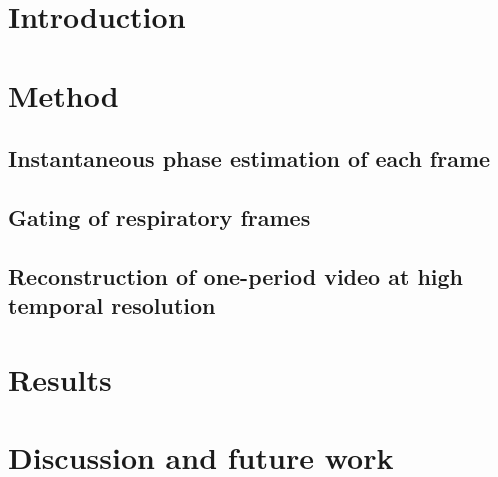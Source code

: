 \documentclass[runningheads,a4paper]{llncs}
\begin{document}
\vspace{-0.5cm}
\section{Introduction}
\label{sec:intro}
%

%
\vspace{-0.5cm}
\section{Method}
\label{sec:method}
%

%
\vspace{-0.5cm}
\subsection{Instantaneous phase estimation of each frame}
\label{sec:method:phase_estimation}
%

%
\vspace{-0.5cm}
\subsection{Gating of respiratory frames}
\label{sec:method:gating}
%

%
\vspace{-0.5cm}
\subsection{Reconstruction of one-period video at high temporal resolution}
\label{sec:method:gating}
%

\vspace{-0.5cm}
\section{Results}
\label{sec:results}
%

%
\vspace{-0.5cm}
\section{Discussion and future work}
\label{sec:discussion}
%


%
\vspace{-0.5cm}


\end{document}
